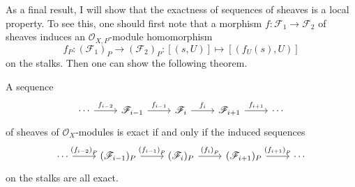 As a final result, I will show that the exactness of sequences of sheaves
is a local property. To see this, one should first note that a morphism
$f:\mathscr{F}_{1}\to\mathscr{F}_{2}$ of sheaves induces an
$\mathscr{O}_{X,P}$-module homomorphism
\[
  f_{P}:\left(\mathscr{F}_{1}\right)_{P}\to\left(\mathscr{F}_{2}\right)_{P}
  :[(s,U)]\mapsto [(f_{U}(s),U)]
\]
on the stalks. Then one can show the following theorem.
\begin{thm}\label{thm:ses_equivalence}
  A sequence
  \[\begin{tikzcd}
      \cdots\rar{f_{i-2}} & \mathscr{F}_{i-1}\rar{f_{i-1}}
      & \mathscr{F}_{i}\rar{f_{i}} & \mathscr{F}_{i+1}\rar{f_{i+1}} & \cdots
    \end{tikzcd}\]
  of sheaves of $\mathscr{O}_{X}$-modules is exact if and only if the
  induced sequences
  \[\begin{tikzcd}
      \cdots\rar{\left(f_{i-2}\right)_{P}}
      & (\mathscr{F}_{i-1})_{P}\rar{\left(f_{i-1}\right)_{P}}
      & (\mathscr{F}_{i})_{P}\rar{\left(f_{i}\right)_{P}}
      & (\mathscr{F}_{i+1})_{P}\rar{\left(f_{i+1}\right)_{P}} & \cdots
    \end{tikzcd}\]
  on the stalks are all exact.
\end{thm}

